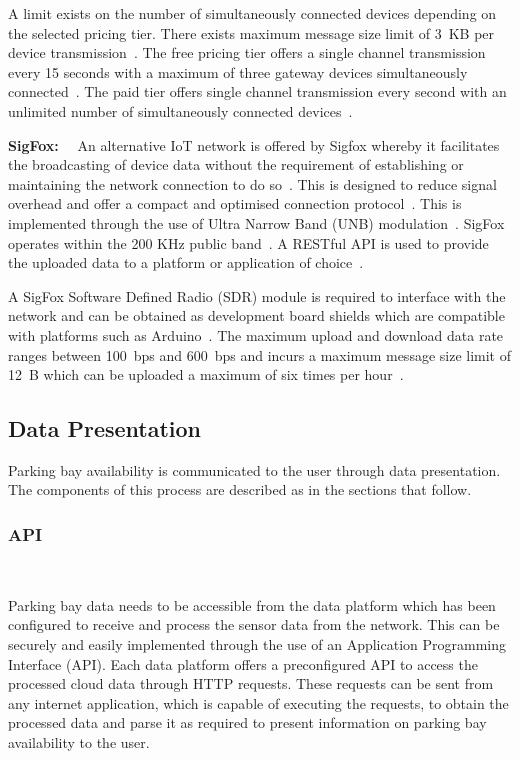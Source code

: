 \documentclass[10pt,twocolumn]{witseiepaper}
\begin{document}
				A limit exists on the number of simultaneously connected devices depending on the selected pricing tier. There exists maximum message size limit of 3~KB per device transmission~\cite{thing-quota}. The free pricing tier offers a single channel transmission every 15 seconds with a maximum of three gateway devices simultaneously connected~\cite{thing-quota}. The paid tier offers single channel transmission every second with an unlimited number of simultaneously connected devices~\cite{thing-quota}.
				
				\textbf{SigFox:}~~
				An alternative IoT network is offered by Sigfox whereby it facilitates the broadcasting of device data without the requirement of establishing or maintaining the network connection to do so~\cite{sigfox-tech}. This is designed to reduce signal overhead and offer a compact and optimised connection protocol~\cite{sigfox-security}. This is implemented through the use of Ultra Narrow Band (UNB) modulation~\cite{sigfox-tech}. SigFox operates within the 200 KHz public band~\cite{sigfox-tech}. A RESTful API is used to provide the uploaded data to a platform or application of choice~\cite{sigfox-security}.
				
				A SigFox Software Defined Radio (SDR) module is required to interface with the network and can be obtained as development board shields which are compatible with platforms such as Arduino~\cite{sigfox-tech}. The maximum upload and download data rate ranges between 100~bps and 600~bps and incurs a maximum message size limit of 12~B which can be uploaded a maximum of six times per hour~\cite{sigfox-tech}.
	
	\subsection{Data Presentation}
		Parking bay availability is communicated to the user through data presentation.  The components of this process are described as in the sections that follow.
		
		\subsubsection{API} $   $
		
			Parking bay data needs to be accessible from the data platform which has been configured to receive and process the sensor data from the network. This can be securely and easily implemented through the use of an Application Programming Interface (API). Each data platform offers a preconfigured API to access the processed cloud data through HTTP requests. These requests can be sent from any internet application, which is capable of executing the requests, to obtain the processed data and parse it as required to present information on parking bay availability to the user.
		
\end{document}
